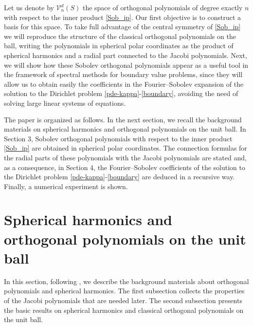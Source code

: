 \documentclass{amsart}
\theoremstyle{plain}%
\theoremstyle{definition}
\theoremstyle{remark}
\begin{document}
Let us denote by \(\mathcal{V}_n^d(S)\) the space of orthogonal polynomials of degree exactly \(n\) with respect to the inner product \eqref{Sob_ip}. Our first objective is to construct a basis for this space. To take full advantage of the central symmetry of \eqref{Sob_ip} we will reproduce the structure of the classical orthogonal polynomials on the ball, writing the polynomials in spherical polar coordinates as the product of spherical harmonics and a radial part connected to the Jacobi polynomials. 
Next, we will show how these Sobolev orthogonal polynomials appear as a useful tool in the framework of spectral methods for boundary value problems, since they will allow us to obtain easily the coefficients in the Fourier--Sobolev expansion of the solution to the Dirichlet problem \eqref{pde-kappa}-\eqref{boundary},
avoiding the need of solving large linear systems of equations.

\bigskip

The paper is organized as follows. In the next section, we recall the background materials on spherical harmonics and orthogonal polynomials on the unit ball.  In Section 3, Sobolev orthogonal polynomials with respect to the inner product \eqref{Sob_ip} are obtained in spherical polar coordinates. The connection formulas for the radial parts of these polynomials with the Jacobi polynomials are stated and, as a consequence, in Section 4, the Fourier--Sobolev  coefficients of the solution to the Dirichlet problem \eqref{pde-kappa}-\eqref{boundary} are deduced in a recursive way. Finally, a numerical experiment is shown.

\section{Spherical harmonics and orthogonal polynomials on the unit ball}
\setcounter{equation}{0}

In this section, following \cite{FPP}, we describe the background materials about orthogonal polynomials and spherical harmonics. The first subsection collects the properties of the Jacobi polynomials that are needed later. The second subsection presents the basic results on spherical harmonics and classical orthogonal polynomials on the unit ball. 
\end{document}
